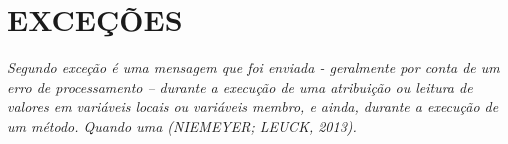 \section{EXCEÇÕES}

\textit{Segundo  exceção é uma mensagem que foi enviada - geralmente por conta de um 
erro de processamento – durante a execução de uma atribuição ou leitura de 
valores em variáveis locais ou variáveis membro, e ainda, durante a execução 
de um método. Quando uma (NIEMEYER; LEUCK, 2013).}